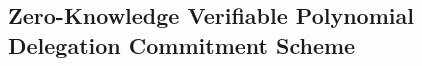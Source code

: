 
\subsection{Zero-Knowledge Verifiable Polynomial Delegation Commitment Scheme}
\begin{definition}
\label{def::zkvpd}
\end{definition}